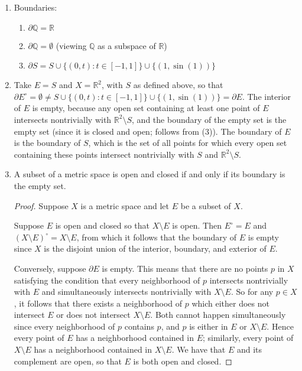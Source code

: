 \documentclass[12pt]{amsart}
\begin{document}
\begin{enumerate}
  \item Boundaries: \begin{enumerate}
      \item $\partial \mathbb{Q}  = \mathbb{R}$
      \item $\partial \mathbb{Q} = \emptyset$ (viewing $\mathbb{Q}$ as a subspace of $\mathbb{R}$)
      \item $\partial S = S\cup \{(0,t)\colon t\in [-1,1]\}\cup \{(1,\sin(1))\}$
  \end{enumerate}
  \item Take $E = S$ and $X = \mathbb{R}^2$, with $S$ as defined above, so that $\partial E^\circ = \emptyset \neq S\cup \{(0,t)\colon t\in [-1,1]\}\cup \{(1,\sin(1))\} = \partial E$. The interior of $E$ is empty, because any open set containing at least one point of $E$ intersects nontrivially with $\mathbb{R}^2\setminus S$, and the boundary of the empty set is the empty set (since it is closed and open; follows from (3)). The boundary of $E$ is the boundary of $S$, which is the set of all points for which every open set containing these points intersect nontrivially with $S$ and $\mathbb{R}^2\setminus S$.
  \item A subset of a metric space is open and closed if and only if its boundary is the empty set. \begin{proof}
      Suppose $X$ is a metric space and let $E$ be a subset of $X$.

      Suppose $E$ is open and closed so that $X\setminus E$ is open. Then $E^\circ = E$ and $(X\setminus E)^\circ = X\setminus E$, from which it follows that the boundary of $E$ is empty since $X$ is the disjoint union of the interior, boundary, and exterior of $E$.

      Conversely, suppose $\partial E$ is empty. This means that there are no points $p$ in $X$ satisfying the condition that every neighborhood of $p$ intersects nontrivially with $E$ and simultaneously intersects nontrivially with $X\setminus E$. So for any $p\in X$, it follows that there exists a neighborhood of $p$ which either does not intersect $E$ or does not intersect $X\setminus E$. Both cannot happen simultaneously since every neighborhood of $p$ contains $p$, and $p$ is either in $E$ or $X\setminus E$. Hence every point of $E$ has a neighborhood contained in $E$; similarly, every point of $X\setminus E$ has a neighborhood contained in $X\setminus E$. We have that $E$ and its complement are open, so that $E$ is both open and closed.
  \end{proof} 
\end{enumerate}
\end{document}
